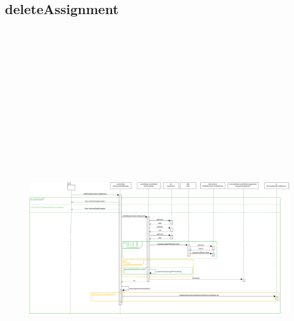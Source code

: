\subsection{deleteAssignment}
\begin{figure}[H]
    \centering\includegraphics[max width=\textwidth, max height=190mm]{../resources/img/GCC/DSD/op5b.png}
\end{figure}